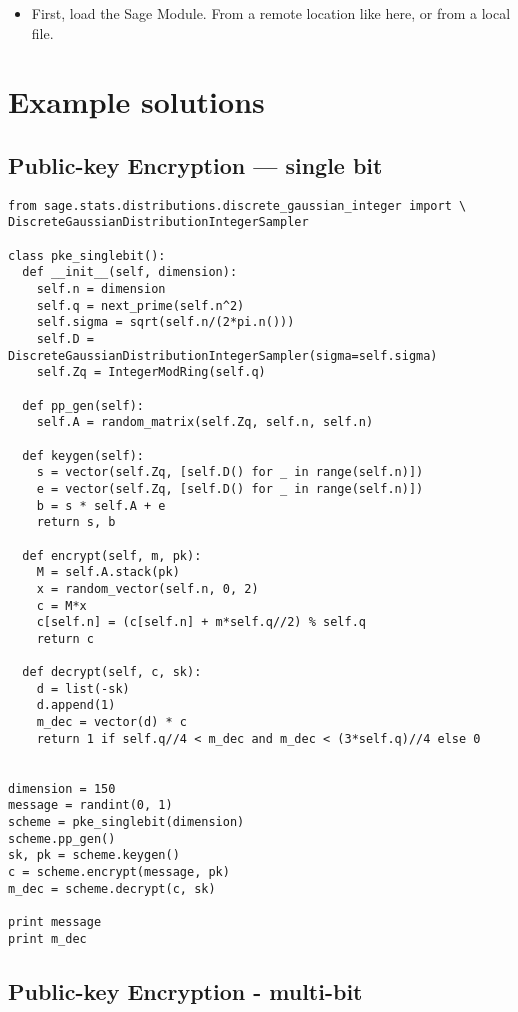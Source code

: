 \documentclass[10pt,a4paper,nobib]{tufte-handout}
\begin{document}
\begin{itemize}
	\item First, load the Sage Module. From a remote location like here, or from a local file.
\end{itemize}

\section{Example solutions}
\subsection{Public-key Encryption --- single bit}

\lstset{language=sage,label= ,caption= ,captionpos=b,numbers=none}
\begin{lstlisting}
from sage.stats.distributions.discrete_gaussian_integer import \
DiscreteGaussianDistributionIntegerSampler

class pke_singlebit():
  def __init__(self, dimension):
    self.n = dimension
    self.q = next_prime(self.n^2)
    self.sigma = sqrt(self.n/(2*pi.n()))
    self.D = DiscreteGaussianDistributionIntegerSampler(sigma=self.sigma)
    self.Zq = IntegerModRing(self.q)

  def pp_gen(self):
    self.A = random_matrix(self.Zq, self.n, self.n)

  def keygen(self):
    s = vector(self.Zq, [self.D() for _ in range(self.n)])
    e = vector(self.Zq, [self.D() for _ in range(self.n)])
    b = s * self.A + e
    return s, b

  def encrypt(self, m, pk):
    M = self.A.stack(pk)
    x = random_vector(self.n, 0, 2)
    c = M*x 
    c[self.n] = (c[self.n] + m*self.q//2) % self.q
    return c

  def decrypt(self, c, sk):
    d = list(-sk)
    d.append(1)
    m_dec = vector(d) * c
    return 1 if self.q//4 < m_dec and m_dec < (3*self.q)//4 else 0


dimension = 150
message = randint(0, 1)
scheme = pke_singlebit(dimension)
scheme.pp_gen()
sk, pk = scheme.keygen()
c = scheme.encrypt(message, pk)
m_dec = scheme.decrypt(c, sk)

print message
print m_dec
\end{lstlisting}

\subsection{Public-key Encryption - multi-bit}
\end{document}
